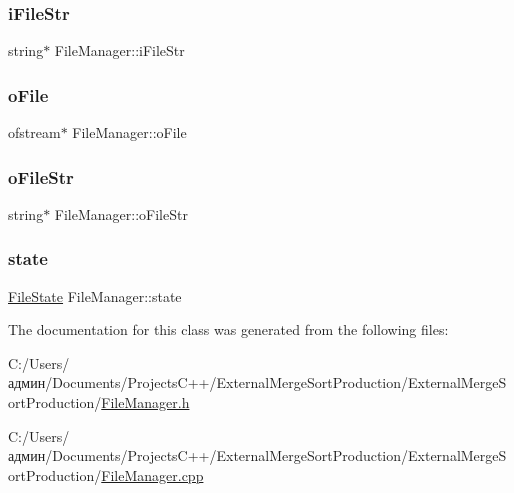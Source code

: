 \subsubsection{\texorpdfstring{i\+File\+Str}{iFileStr}}
{\footnotesize\ttfamily string$\ast$ File\+Manager\+::i\+File\+Str\hspace{0.3cm}{\ttfamily [private]}}

\hypertarget{class_file_manager_afe31c07e311212814e4a8ba01c7436a1}{}\label{class_file_manager_afe31c07e311212814e4a8ba01c7436a1} 
\subsubsection{\texorpdfstring{o\+File}{oFile}}
{\footnotesize\ttfamily ofstream$\ast$ File\+Manager\+::o\+File\hspace{0.3cm}{\ttfamily [private]}}

\hypertarget{class_file_manager_adf10708d6e8e3b4d329077af4666e147}{}\label{class_file_manager_adf10708d6e8e3b4d329077af4666e147} 
\subsubsection{\texorpdfstring{o\+File\+Str}{oFileStr}}
{\footnotesize\ttfamily string$\ast$ File\+Manager\+::o\+File\+Str\hspace{0.3cm}{\ttfamily [private]}}

\hypertarget{class_file_manager_a84bbcd4e3807e076ecdbd0e5dfbefa5f}{}\label{class_file_manager_a84bbcd4e3807e076ecdbd0e5dfbefa5f} 
\subsubsection{\texorpdfstring{state}{state}}
{\footnotesize\ttfamily \hyperlink{_structures_8h_a57306ae0f9e356347388234ed69e0ce7}{File\+State} File\+Manager\+::state\hspace{0.3cm}{\ttfamily [private]}}



The documentation for this class was generated from the following files\+:\begin{DoxyCompactItemize}
\item 
C\+:/\+Users/админ/\+Documents/\+Projects\+C++/\+External\+Merge\+Sort\+Production/\+External\+Merge\+Sort\+Production/\hyperlink{_file_manager_8h}{File\+Manager.\+h}\item 
C\+:/\+Users/админ/\+Documents/\+Projects\+C++/\+External\+Merge\+Sort\+Production/\+External\+Merge\+Sort\+Production/\hyperlink{_file_manager_8cpp}{File\+Manager.\+cpp}\end{DoxyCompactItemize}
